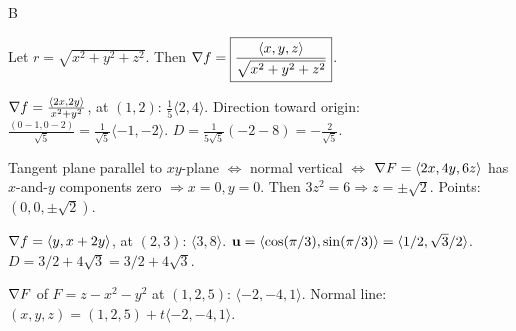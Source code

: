 \documentclass[11pt]{article}
\begin{document}
\begin{answers}{B}
\item Let $r = \sqrt{x^2+y^2+z^2}$. Then $\nabla f = \boxed{\dfrac{\langle x, y, z\rangle}{\sqrt{x^2+y^2+z^2}}}$.
\item $\nabla f = \tfrac{\langle 2x, 2y\rangle}{x^2+y^2}$, at $(1,2)$: $\tfrac{1}{5}\langle 2, 4\rangle$. Direction toward origin: $\tfrac{(0-1, 0-2)}{\sqrt 5} = \tfrac{1}{\sqrt 5}\langle -1, -2\rangle$. $D = \tfrac{1}{5\sqrt 5}(-2 - 8) = \boxed{-\tfrac{2}{\sqrt 5}}$.
\item Tangent plane parallel to $xy$-plane $\Leftrightarrow$ normal vertical $\Leftrightarrow$ $\nabla F = \langle 2x, 4y, 6z\rangle$ has $x$-and-$y$ components zero $\Rightarrow x = 0, y = 0$. Then $3z^2 = 6 \Rightarrow z = \pm \sqrt 2$. Points: $\boxed{(0, 0, \pm\sqrt 2)}$.
\item $\nabla f = \langle y, x + 2y\rangle$, at $(2,3)$: $\langle 3, 8\rangle$. $\mathbf{u} = \langle \cos(\pi/3), \sin(\pi/3)\rangle = \langle 1/2, \sqrt 3/2\rangle$. $D = 3/2 + 4\sqrt 3 = \boxed{3/2 + 4\sqrt 3}$.
\item $\nabla F$ of $F = z - x^2 - y^2$ at $(1,2,5)$: $\langle -2, -4, 1\rangle$. Normal line: $\boxed{(x,y,z) = (1,2,5) + t\langle -2, -4, 1\rangle}$.
\end{answers}
\end{document}
